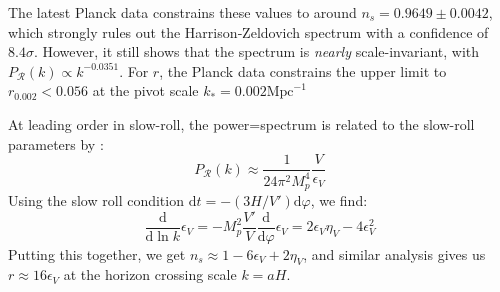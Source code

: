 \documentclass[aps,prd,reprint,preprintnumbers,showpacs,floatfix,nofootinbib,superscript address]{revtex4-2}
\begin{document}
The latest Planck data \cite{collaboration_planck_2020} constrains these values to around $n_s = 0.9649 \pm 0.0042$, which strongly rules out the Harrison‑Zeldovich spectrum with a confidence of $8.4\sigma$. However, it still shows that the spectrum is  \textit{nearly} scale-invariant, with $P_\mathcal{R}(k) \propto k^{-0.0351}$. For $r$, the Planck data constrains the upper limit to $r_{0.002} < 0.056$ at the pivot scale $k_* =0.002 \text{Mpc}^{-1}$

At leading order in slow-roll, the power=spectrum is related to the slow-roll parameters by \cite{liddle_cosmological_2000}:
\begin{equation}
    P_\mathcal{R}(k) \approx \frac{1}{24\pi^2 M_p^4} \frac{V}{\epsilon_V}
\end{equation}
Using the slow roll condition $\text{d}t = -(3H/V') \text{d}\varphi$, we find:
\begin{equation}
    \frac{\text{d}}{\text{d} \ln k} \epsilon_V = -M_p^2 \frac{V'}{V}\frac{\text{d}}{\text{d}\varphi}\epsilon_V = 2\epsilon_V\eta_V - 4\epsilon_V^2
\end{equation}
Putting this together, we get $n_s \approx 1 -6\epsilon_V +2\eta_V$, and similar analysis \cite{baumann2012tasilecturesinflation} gives us $r \approx 16 \epsilon_V$ at the horizon crossing scale $k = aH$.
\end{document}
